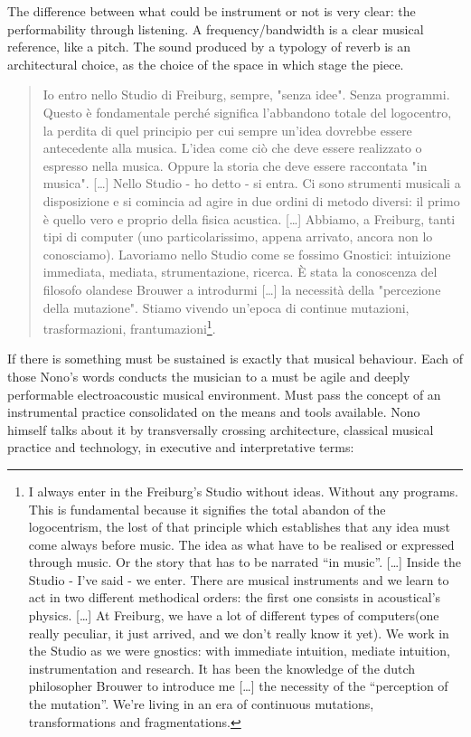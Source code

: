 \documentclass[twoside,a4paper]{article}
\begin{document}
The difference between what could be instrument or not is very clear: the performability through listening. A frequency/bandwidth is a clear musical reference, like a pitch. The sound produced by a typology of reverb is an architectural choice, as the choice of the space in which stage the piece. 

\begin{quote}
Io entro nello Studio di Freiburg, sempre, "senza idee". Senza programmi. Questo è fondamentale perché significa l'abbandono totale del logocentro, la perdita di quel principio per cui sempre un'idea dovrebbe essere antecedente alla musica. L'idea come ciò che deve essere realizzato o espresso nella musica. Oppure la storia che deve essere raccontata "in musica". [\ldots] Nello Studio - ho detto - si entra. Ci sono strumenti musicali a disposizione e si comincia ad agire in due ordini di metodo diversi: il primo è quello vero e proprio della fisica acustica. [\ldots] Abbiamo, a Freiburg, tanti tipi di computer (uno particolarissimo, appena arrivato, ancora non lo conosciamo). Lavoriamo nello Studio come se fossimo Gnostici: intuizione immediata, mediata, strumentazione, ricerca. È stata la conoscenza del filosofo olandese Brouwer a introdurmi [\ldots] la necessità della "percezione della mutazione". Stiamo vivendo un'epoca di continue mutazioni, trasformazioni, frantumazioni\cite{nono85}\footnote{I always enter in the Freiburg’s Studio without ideas. Without any programs. This is fundamental because it signifies the total abandon of the logocentrism, the lost of that principle which establishes that any idea must come always before music. The idea as what have to be realised or expressed through music. Or the story that has to be narrated “in music”. [\dots] Inside the Studio - I’ve said - we enter. There are musical instruments and we learn to act in two different methodical orders: the first one consists in acoustical’s physics. [\dots] At Freiburg, we have a lot of different types of computers(one really peculiar, it just arrived, and we don’t really know it yet). We work in the Studio as we were gnostics: with immediate intuition, mediate intuition, instrumentation and research. It has been the knowledge of the dutch philosopher Brouwer to introduce me [\dots] the necessity of the “perception of the mutation”. We’re living in an era of continuous mutations, transformations and fragmentations.}. 
\end{quote}

If there is something must be sustained is exactly that musical behaviour. Each of those Nono's words conducts the musician to a must be agile and deeply performable electroacoustic musical environment. Must pass the concept of an instrumental practice consolidated on the means and tools available. Nono himself talks about it by transversally crossing architecture, classical musical practice and technology, in executive and interpretative terms:
\end{document}
